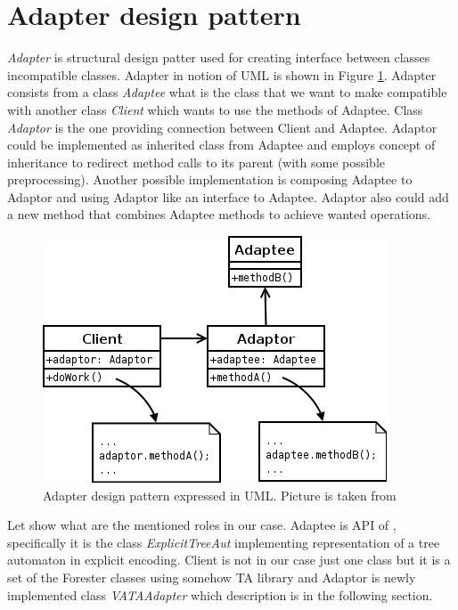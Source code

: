 \section{Adapter design pattern}
\label{sec:adapter}

\emph{Adapter} is structural design patter \cite{gamma95} used for creating interface between classes incompatible classes.
Adapter in notion of UML is shown in Figure \ref{fig:adapter}.
Adapter consists from a class \emph{Adaptee} what is the class that we want to make compatible with
another class \emph{Client} which wants to use the methods of Adaptee.
Class \emph{Adaptor} is the one providing connection between Client and Adaptee.
Adaptor could be implemented as inherited class from Adaptee and employs concept of inheritance to redirect
method calls to its parent (with some possible preprocessing).
Another possible implementation is composing Adaptee to Adaptor and using Adaptor like an interface to Adaptee.
Adaptor also could add a new method that combines Adaptee methods to achieve wanted operations.

\begin{figure}
	\begin{center}
		\includegraphics[scale=0.5]{fig/adapter.png}
	\end{center}
	\caption{Adapter design pattern expressed in UML.
	Picture is taken from \cite{wiki:adapter}}
	\label{fig:adapter}
\end{figure}

Let show what are the mentioned roles in our case.
Adaptee is API of \vata, specifically it is the class \emph{ExplicitTreeAut} implementing representation of a tree automaton in explicit encoding.
Client is not in our case just one class but it is a set of the Forester classes using somehow TA library
and Adaptor is newly implemented class \emph{VATAAdapter} which description is in the following section.

